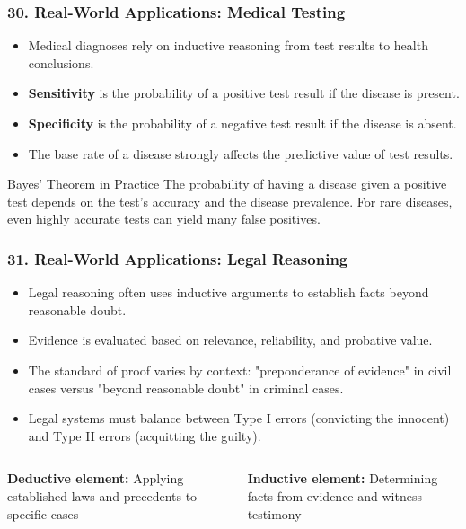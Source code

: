 \documentclass{beamer}
\begin{document}
\begin{frame}
\frametitle{30. Real-World Applications: Medical Testing}
\begin{itemize}
\item Medical diagnoses rely on inductive reasoning from test results to health conclusions.
\item \textbf{Sensitivity} is the probability of a positive test result if the disease is present.
\item \textbf{Specificity} is the probability of a negative test result if the disease is absent.
\item The base rate of a disease strongly affects the predictive value of test results.
\end{itemize}

\begin{block}{Bayes' Theorem in Practice}
The probability of having a disease given a positive test depends on the test's accuracy and the disease prevalence. For rare diseases, even highly accurate tests can yield many false positives.
\end{block}
\end{frame}

\begin{frame}
\frametitle{31. Real-World Applications: Legal Reasoning}
\begin{itemize}
\item Legal reasoning often uses inductive arguments to establish facts beyond reasonable doubt.
\item Evidence is evaluated based on relevance, reliability, and probative value.
\item The standard of proof varies by context: "preponderance of evidence" in civil cases versus "beyond reasonable doubt" in criminal cases.
\item Legal systems must balance between Type I errors (convicting the innocent) and Type II errors (acquitting the guilty).
\end{itemize}

\begin{columns}
\textbf{Deductive element:}
Applying established laws and precedents to specific cases

\textbf{Inductive element:}
Determining facts from evidence and witness testimony
\end{columns}
\end{frame}
\end{document}
